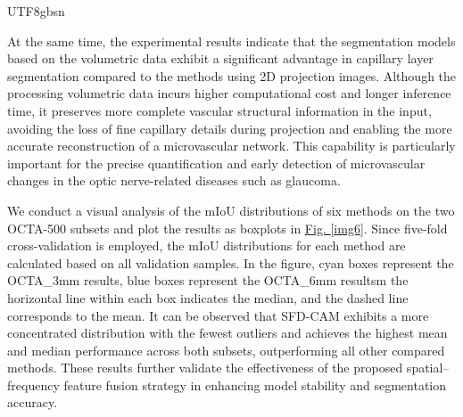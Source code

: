 \documentclass[times, review, 10pt]{elsarticle}
\begin{document}
\begin{CJK}{UTF8}{gbsn}
\par
At the same time, the experimental results indicate that the segmentation models based on the volumetric data exhibit a significant advantage in capillary layer segmentation compared to the methods using 2D projection images. Although the processing volumetric data incurs higher computational cost and longer inference time, it preserves more complete vascular structural information in the input, avoiding the loss of fine capillary details during projection and enabling the more accurate reconstruction of a microvascular network. This capability is particularly important for the precise quantification and early detection of microvascular changes in the optic nerve-related diseases such as glaucoma.
\par



We conduct a visual analysis of the mIoU distributions of six methods on the two OCTA-500 subsets and plot the results as boxplots in \hyperref[img6]{Fig. \ref*{img6}}. Since five-fold cross-validation is employed, the mIoU distributions for each method are calculated based on all validation samples. In the figure, cyan boxes represent the OCTA\_3mm results, blue boxes represent the OCTA\_6mm resultsm the horizontal line within each box indicates the median, and the dashed line corresponds to the mean. It can be observed that SFD-CAM exhibits a more concentrated distribution with the fewest outliers and achieves the highest mean and median performance across both subsets, outperforming all other compared methods. These results further validate the effectiveness of the proposed spatial–frequency feature fusion strategy in enhancing model stability and segmentation accuracy.


\end{CJK}
\end{document}
